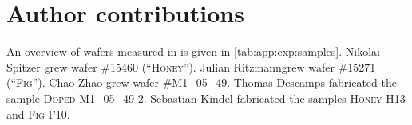 \chapter*{Author contributions}
An overview of wafers measured in \thispart is given in \cref{tab:app:exp:samples}.
Nikolai Spitzer\sidenote[a]{\RUB} grew wafer \textsc{\#15460 (\enquote{Honey})}.
Julian Ritzmann\sidenotemark[a] grew wafer \textsc{\#15271 (\enquote{Fig})}.
Chao Zhao grew wafer \textsc{\#M1\_05\_49}.
Thomas Descamps fabricated the sample \textsc{Doped M1\_05\_49-2}.
Sebastian Kindel fabricated the samples \textsc{Honey H13} and \textsc{Fig F10}.

